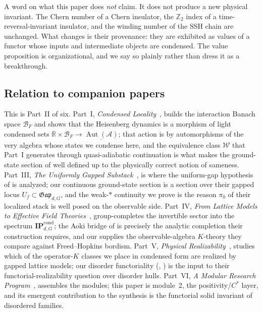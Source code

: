 \documentclass[12pt]{article}
\newcommand{\cond}[1]{\underline{#1}}          %
\newcommand{\BF}{\mathcal{B}_{F}}              %
\newcommand{\Gap}{\mathfrak{Gap}}              %
\newcommand{\Weq}{\mathcal{W}}                 %
\newcommand{\IPcond}{\mathbf{IP}^{\mathrm{cond}}}  %
\newcommand{\qla}{\mathcal{A}}                  %
\newcommand{\Aut}{\operatorname{Aut}}          %
\newcommand{\RR}{\mathbb{R}}
\newcommand{\ZZ}{\mathbb{Z}}
\theoremstyle{plain}
\begin{document}
A word on what this paper does \emph{not} claim. It does not produce a new physical
invariant. The Chern number of a Chern insulator, the $\ZZ_{2}$ index of a
time-reversal-invariant insulator, and the winding number of the SSH chain
are unchanged. What changes is their provenance: they are exhibited as values of a
functor whose inputs and intermediate objects are condensed. The value proposition
is organizational, and we say so plainly rather than dress it as a breakthrough.

\subsection{Relation to companion papers}
\label{sec:companions}

This is Part~II of six. Part~I,
\emph{Condensed Locality}~\cite{paperLocality}, builds the interaction Banach space
$\BF$ and shows that the Heisenberg dynamics is a morphism of light condensed sets
$\RR\times\cond{\BF}\to\cond{\Aut(\qla)}$; that action is by automorphisms of the
very algebra whose states we condense here, and the equivalence class $\Weq$ that
Part~I generates through quasi-adiabatic continuation is what makes the ground-state
section of  well defined up to the physically correct notion
of sameness. Part~III,
\emph{The Uniformly Gapped Substack}~\cite{paperGap}, is where the uniform-gap
hypothesis of  is analyzed; our continuous ground-state
section is a section over their gapped locus $U_{f}\subset\Gap_{d,G}$, and the
weak-$\ast$ continuity we prove is the reason $\pi_{0}$ of their localized stack is
well posed on the observable side. Part~IV,
\emph{From Lattice Models to Effective Field Theories}~\cite{paperEFT},
group-completes the invertible sector into the spectrum $\IPcond_{d,G}$; the Aoki
bridge of  is precisely the analytic completion their construction
requires, and our  supplies the observable-algebra
$K$-theory they compare against Freed--Hopkins bordism. Part~V,
\emph{Physical Realizability}~\cite{paperRealizability}, studies which of the
operator-$K$ classes we place in condensed form are realized by gapped lattice
models; our disorder functoriality (, ) is the
input to their functorial-realizability question over disorder hulls. Part~VI,
\emph{A Modular Research Program}~\cite{paperSynthesis}, assembles the modules; this
paper is module~2, the positivity/$C^{*}$ layer, and its emergent contribution to
the synthesis is the functorial solid invariant of disordered families.
\end{document}
